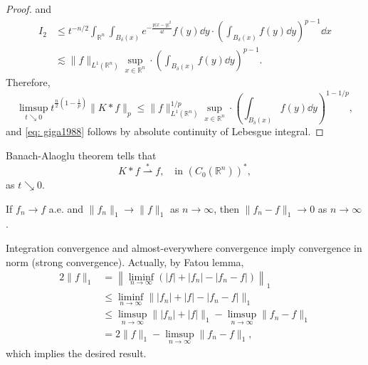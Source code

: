 \begin{proof}
	and 
	\begin{align*}
		I_2
		&\leq t^{-n/2} \int_{\mathbb R^n}\int_{B_\delta(x)}e^{-\frac{p|x-y|^2}{4t}}f(y)\dd y
		\cdot \left(\int_{B_\delta(x)}f(y)\dd y\right)^{p-1}\dd x\\
		&\lesssim \|f\|_{L^1(\mathbb R^n)}\sup_{x\in\mathbb R^n} \cdot \left(\int_{B_\delta(x)}f(y)\dd y\right)^{p-1}.
	\end{align*}
	Therefore,
	\[
	\limsup_{t\searrow0}	t^{\frac{n}{2}\left(1-\frac1p\right)}\|K*f\|_p 
	\leq \|f\|^{1/p}_{L^1(\mathbb R^n)}\sup_{x\in\mathbb R^n} 
	\cdot \left(\int_{B_\delta(x)}f(y)\dd y\right)^{1-1/p},
	\]
	and \eqref{eq: giga1988} follows by absolute continuity of Lebesgue integral.
\end{proof}

\begin{remark}
	Banach-Alaoglu theorem tells that 
	\[
	K*f \overset{\ast}{\rightharpoonup} f,\quad \text{in } (C_0(\mathbb R^n))^*,
	\]
	as $t\searrow0$.

	If $f_n\to f$ a.e. and $\|f_n\|_1\to\|f\|_1$ as $n\to\infty$, 
	then $\|f_n-f\|_1 \to 0$ as $n\to\infty$.

	Integration convergence and almost-everywhere convergence imply convergence in norm (strong convergence).
	Actually, by Fatou lemma,
	\begin{align*}
	2\|f\|_1 &= \left\|\liminf_{n\to\infty}(|f|+|f_n|-|f_n-f|)\right\|_1\\
	&\leq \liminf_{n\to\infty}\||f_n|+|f|-|f_n-f|\|_1\\
	&\leq \limsup_{n\to\infty}\||f_n|+|f|\|_1 - \limsup_{n\to\infty}\|f_n-f\|_1\\
	&= 2\|f\|_1 - \limsup_{n\to\infty}\|f_n-f\|_1,
	\end{align*}
	which implies the desired result.	
\end{remark}


